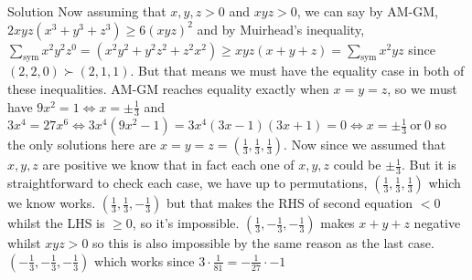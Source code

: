 \documentclass{article}
\begin{document}
\begin{solution}{Solution}
Now assuming that $x,y,z > 0$  and $xyz > 0$, we can say
by AM-GM, $2xyz(x^3 + y^3 + z^3) \geq 6(xyz)^2$ and by Muirhead's
inequality, $\sum_{\text{sym}} x^2 y^2 z^0 = (x^2 y^2 + y^2 z^2 + z^2 x^2)
\geq xyz(x+y+z) = \sum_{\text{sym}} x^2 yz$ since $(2,2,0)\succ (2,1,1)$.
But that means we must have the equality case in both of these
inequalities. AM-GM reaches equality exactly when $x=y=z$, so we must
have $9x^2 = 1 \iff x = \pm \frac{1}{3}$ and $3x^4 = 27x^6 \iff
3x^4(9x^2 - 1) = 3x^4 (3x-1)(3x+1) = 0 \iff x = \pm \frac{1}{3} \ \text{or} \ 0$
so the only solutions here are $x=y=z=\left(\frac{1}{3}, \frac{1}{3},\frac{1}{3}\right)$.
Now since we assumed that $x,y,z$ are positive we know that in fact each
one of $x,y,z$ could be $\pm \frac{1}{3}$. But it is straightforward to
check each case, we have up to permutations,
$(\frac{1}{3}, \frac{1}{3}, \frac{1}{3})$ which we know works.
$(\frac{1}{3}, \frac{1}{3}, -\frac{1}{3})$ but that makes the RHS of second
equation $<0$ whilst the LHS is $\geq 0$, so it's impossible.
$(\frac{1}{3}, -\frac{1}{3}, -\frac{1}{3})$ makes $x+y+z$ negative whilst
$xyz > 0$ so this is also impossible by the same reason as the last case.
$(-\frac{1}{3}, -\frac{1}{3}, -\frac{1}{3})$ which works since
$3 \cdot \frac{1}{81} = -\frac{1}{27} \cdot -1$
\end{solution}
\end{document}
